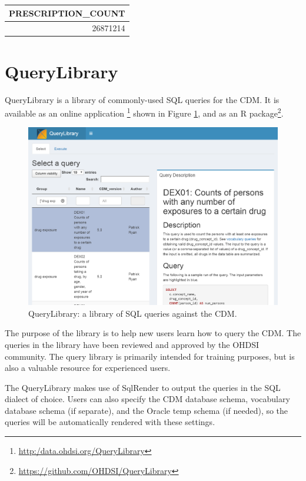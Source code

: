 \documentclass[11pt]{book}
\let\rmarkdownfootnote\footnote%
\def\footnote{\protect\rmarkdownfootnote}
\begin{document}
\begin{longtable}[]{@{}r@{}}
\toprule
PRESCRIPTION\_COUNT\tabularnewline
\midrule
\endhead
26871214\tabularnewline
\bottomrule
\end{longtable}

\section{QueryLibrary}\label{querylibrary}

QueryLibrary is a library of commonly-used SQL queries for the CDM. It
is available as an online application \footnote{\url{http:/data.ohdsi.org/QueryLibrary}}
shown in Figure \ref{fig:queryLibrary}, and as an R package\footnote{\url{https://github.com/OHDSI/QueryLibrary}}.

\begin{figure}

{\centering \includegraphics[width=1\linewidth]{images/SqlAndR/queryLibrary} 

}

\caption{QueryLibrary: a library of SQL queries against the CDM.}\label{fig:queryLibrary}
\end{figure}

The purpose of the library is to help new users learn how to query the
CDM. The queries in the library have been reviewed and approved by the
OHDSI community. The query library is primarily intended for training
purposes, but is also a valuable resource for experienced users.

The QueryLibrary makes use of SqlRender to output the queries in the SQL
dialect of choice. Users can also specify the CDM database schema,
vocabulary database schema (if separate), and the Oracle temp schema (if
needed), so the queries will be automatically rendered with these
settings.
\end{document}
